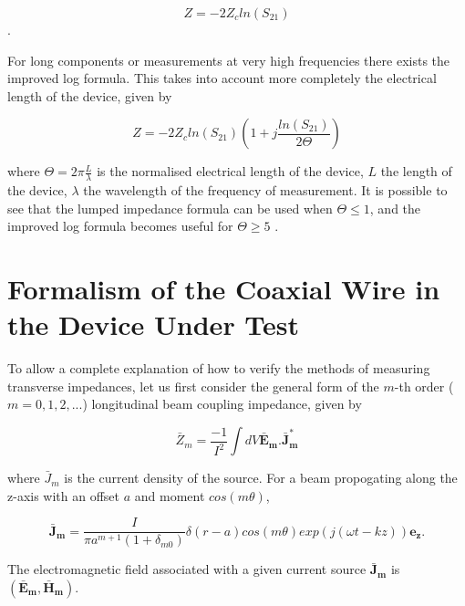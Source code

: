 \documentclass[review, number, sort&compress]{elsarticle}
\begin{document}
\begin{equation}
Z = -2Z_{c} ln \left( S_{21} \right)
\end{equation}.

For long components or measurements at very high frequencies there exists the improved log formula. This takes into account more completely the electrical length of the device, given by

\begin{equation}
Z = -2Z_{c} ln \left( S_{21}  \right) \left( 1 + j\frac{ln \left( S_{21}\right) }{2\Theta}  \right)
\end{equation}

where $\Theta = 2\pi \frac{L}{\lambda}$ is the normalised electrical length of the device, $L$ the length of the device, $\lambda$ the wavelength of the frequency of measurement. It is possible to see that the lumped impedance formula can be used when $\Theta \leq 1$, and the improved log formula becomes useful for $\Theta \geq 5$ \cite{Jensen:ImprovLogForm}.

\section{Formalism of the Coaxial Wire in the Device Under Test}
\label{sec:MathematicalFormalism}

To allow a complete explanation of how to verify the methods of measuring transverse impedances, let us first consider the general form of the $m$-th order ($m = 0, 1, 2,...$) longitudinal beam coupling impedance, given by \cite{Chao:PhysColEff, Tsutsui:OnSingleWire}

\begin{equation}
\bar{Z}_{m} = \frac{-1}{I^{2}} \int dV \mathbf{\bar{E}_{m}. \bar{J}_{m}^{*}}
\end{equation}

where $\bar{J}_{m}$ is the current density of the source. For a beam propogating along the z-axis with an offset $a$ and moment $cos \left( m \theta \right)$,

\begin{equation}
\mathbf{\bar{J}_{m}} = \frac{I}{\pi a^{m +1} \left( 1 + \delta_{m0} \right)} \delta \left( r - a \right) cos \left( m \theta \right) exp \left( j \left( \omega t - k z  \right) \right) \mathbf{e_{z}}.
\end{equation}

The electromagnetic field associated with a given current source $\mathbf{\bar{J}_{m}}$ is $\left( \mathbf{\bar{E}_{m}}, \mathbf{\bar{H}_{m}} \right)$. 
\end{document}
